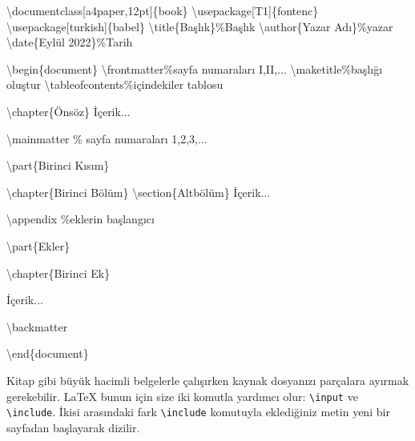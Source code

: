 \documentclass[
  letterpaper,
  DIV=11,
  numbers=noendperiod]{scrreprt}
\newenvironment{Shaded}{\begin{snugshade}}{\end{snugshade}}
\newcommand{\BuiltInTok}[1]{\textcolor[rgb]{0.00,0.23,0.31}{#1}}
\newcommand{\CommentTok}[1]{\textcolor[rgb]{0.37,0.37,0.37}{#1}}
\newcommand{\ExtensionTok}[1]{\textcolor[rgb]{0.00,0.23,0.31}{#1}}
\newcommand{\FunctionTok}[1]{\textcolor[rgb]{0.28,0.35,0.67}{#1}}
\newcommand{\KeywordTok}[1]{\textcolor[rgb]{0.00,0.23,0.31}{#1}}
\newcommand{\NormalTok}[1]{\textcolor[rgb]{0.00,0.23,0.31}{#1}}
\begin{document}
\begin{Shaded}
\begin{Highlighting}[]
\BuiltInTok{\textbackslash{}documentclass}\NormalTok{[a4paper,12pt]\{}\ExtensionTok{book}\NormalTok{\}}
\BuiltInTok{\textbackslash{}usepackage}\NormalTok{[T1]\{}\ExtensionTok{fontenc}\NormalTok{\}}
\BuiltInTok{\textbackslash{}usepackage}\NormalTok{[turkish]\{}\ExtensionTok{babel}\NormalTok{\}}
\FunctionTok{\textbackslash{}title}\NormalTok{\{Başlık\}}\CommentTok{\%Başlık}
\FunctionTok{\textbackslash{}author}\NormalTok{\{Yazar Adı\}}\CommentTok{\%yazar}
\FunctionTok{\textbackslash{}date}\NormalTok{\{Eylül 2022\}}\CommentTok{\%Tarih}

\KeywordTok{\textbackslash{}begin}\NormalTok{\{}\ExtensionTok{document}\NormalTok{\}}
\FunctionTok{\textbackslash{}frontmatter}\CommentTok{\%sayfa numaraları I,II,...}
\FunctionTok{\textbackslash{}maketitle}\CommentTok{\%başlığı oluştur}
\FunctionTok{\textbackslash{}tableofcontents}\CommentTok{\%içindekiler tablosu}

\KeywordTok{\textbackslash{}chapter}\NormalTok{\{Önsöz\}}
\NormalTok{  İçerik...}

\FunctionTok{\textbackslash{}mainmatter} \CommentTok{\% sayfa numaraları 1,2,3,...}

\KeywordTok{\textbackslash{}part}\NormalTok{\{Birinci Kısım\}}

\KeywordTok{\textbackslash{}chapter}\NormalTok{\{Birinci Bölüm\}}
\KeywordTok{\textbackslash{}section}\NormalTok{\{Altbölüm\}}
\NormalTok{  İçerik...}

\FunctionTok{\textbackslash{}appendix} \CommentTok{\%eklerin başlangıcı}

\KeywordTok{\textbackslash{}part}\NormalTok{\{Ekler\}}

\KeywordTok{\textbackslash{}chapter}\NormalTok{\{Birinci Ek\}}

\NormalTok{  İçerik...}

\FunctionTok{\textbackslash{}backmatter}

\KeywordTok{\textbackslash{}end}\NormalTok{\{}\ExtensionTok{document}\NormalTok{\}}
\end{Highlighting}
\end{Shaded}

Kitap gibi büyük hacimli belgelerle çalışırken kaynak dosyanızı
parçalara ayırmak gerekebilir. {\LaTeX} bunun için size iki komutla
yardımcı olur: \texttt{\textbackslash{}input} ve
\texttt{\textbackslash{}include}. İkisi arasındaki fark
\texttt{\textbackslash{}include} komutuyla eklediğiniz metin yeni bir
sayfadan başlayarak dizilir.
\end{document}

